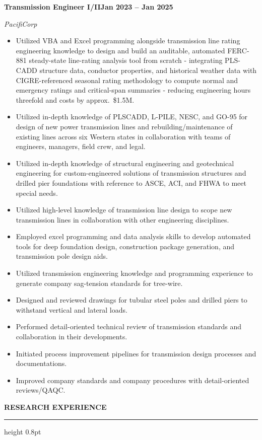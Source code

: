 \documentclass[10pt, letterpaper]{article}
\newcommand{\rsection}[1]{%
  \vspace{8pt}%
  {\large\bfseries\MakeUppercase{#1}}%
  \vspace{1pt}%
  \hrule height 0.8pt%
  \vspace{4pt}%
}
\newcommand{\jobline}[2]{%
  \vspace{5pt}%
  \noindent\textbf{#1}\hfill\textbf{#2}\par%
  \vspace{1pt}%
}
\newcommand{\subline}[1]{%
  \vspace{-1pt}%
  \noindent\textit{#1}\par%
  \vspace{1pt}%
}
\newenvironment{rlist}{%
  \begin{itemize}[leftmargin=1.4em, itemsep=1pt, topsep=2pt, parsep=0pt]%
}{%
  \end{itemize}%
}
\begin{document}
\jobline{Transmission Engineer I/II}{Jan 2023 -- Jan 2025}
\subline{PacifiCorp}
\begin{rlist}
  \item Utilized VBA and Excel programming alongside transmission line rating engineering knowledge to design and build an auditable, automated FERC-881 steady-state line-rating analysis tool from scratch - integrating PLS-CADD structure data, conductor properties, and historical weather data with CIGRE-referenced seasonal rating methodology to compute normal and emergency ratings and critical-span summaries - reducing engineering hours threefold and costs by approx.\ \$1.5M.
  \item Utilized in-depth knowledge of PLSCADD, L-PILE, NESC, and GO-95 for design of new power transmission lines and rebuilding/maintenance of existing lines across six Western states in collaboration with teams of engineers, managers, field crew, and legal.
  \item Utilized in-depth knowledge of structural engineering and geotechnical engineering for custom-engineered solutions of transmission structures and drilled pier foundations with reference to ASCE, ACI, and FHWA to meet special needs.
  \item Utilized high-level knowledge of transmission line design to scope new transmission lines in collaboration with other engineering disciplines.
  \item Employed excel programming and data analysis skills to develop automated tools for deep foundation design, construction package generation, and transmission pole design aids.
  \item Utilized transmission engineering knowledge and programming experience to generate company sag-tension standards for tree-wire.
  \item Designed and reviewed drawings for tubular steel poles and drilled piers to withstand vertical and lateral loads.
  \item Performed detail-oriented technical review of transmission standards and collaboration in their developments.
  \item Initiated process improvement pipelines for transmission design processes and documentations.
  \item Improved company standards and company procedures with detail-oriented reviews/QAQC.
\end{rlist}

\rsection{Research Experience}
\end{document}
